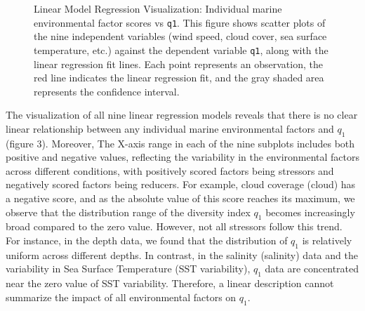 \documentclass[a4paper, 11]{article}
\begin{document}
\begin{figure}[H]
    \centering
    \caption{Linear Model Regression Visualization: Individual marine environmental factor scores vs \texttt{q1}. This figure shows scatter plots of the nine independent variables (wind speed, cloud cover, sea surface temperature, etc.) against the dependent variable \texttt{q1}, along with the linear regression fit lines. Each point represents an observation, the red line indicates the linear regression fit, and the gray shaded area represents the confidence interval.}
    \label{fig:se_mean}
\end{figure}

The visualization of all nine linear regression models reveals that there is no clear linear relationship between any individual marine environmental factors and \(q_1\) (figure 3). Moreover, The X-axis range in each of the nine subplots includes both positive and negative values, reflecting the variability in the environmental factors across different conditions, with positively scored factors being stressors and negatively scored factors being reducers. For example, cloud coverage (cloud) has a negative score, and as the absolute value of this score reaches its maximum, we observe that the distribution range of the diversity index \(q_1\) becomes increasingly broad compared to the zero value. However, not all stressors follow this trend. For instance, in the depth data, we found that the distribution of \(q_1\) is relatively uniform across different depths. In contrast, in the salinity (salinity) data and the variability in Sea Surface Temperature (SST variability), \(q_1\) data are concentrated near the zero value of SST variability. Therefore, a linear description cannot summarize the impact of all environmental factors on \(q_1\).
\end{document}
